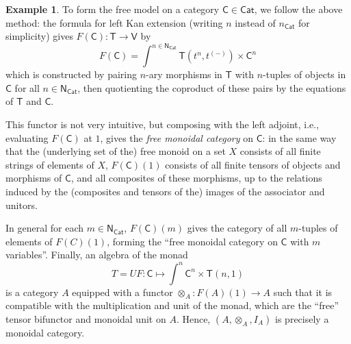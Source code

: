 \documentclass{amsart}
\theoremstyle{definition}
\newtheorem{example}[theorem]{Example}
\newcommand{\Cat}{\mathsf{Cat}}
\newcommand{\NN}{\mathsf{N}}
\newcommand{\V}{\mathsf{V}}
\newcommand{\C}{\mathsf{C}}
\newcommand{\T}{\mathsf{T}}
\newcommand{\maps}{\colon}
\begin{document}
\begin{example}
To form the free model on a category $\C\in \Cat$, we follow the above method: the formula for left Kan extension (writing $n$ instead of $n_\Cat$ for simplicity) gives $F(\C)\maps \T\to \V$ by 
\[   F(\C) = \int^{n\in \NN_\Cat} \T(t^{n},t^{(-)})\times \C^{n} \] 
which is constructed by pairing $n$-ary morphisms in $\T$ with $n$-tuples of objects in $\C$ for all $n\in \NN_\Cat$, then quotienting the coproduct of these pairs by the equations of $\T$ and $\C$.

This functor is not very intuitive, but composing with the left adjoint, i.e., evaluating $F(\C)$ at $1$, gives the \textit{free monoidal category} on $\C$: in the same way that the (underlying set of the) free monoid on a set $X$ consists of all finite strings of elements of $X$, $F(\C)(1)$ consists of all finite tensors of objects and morphisms of $\C$, and all composites of these morphisms, up to the relations induced by the (composites and tensors of the) images of the associator and unitors.

In general for each $m\in \NN_\Cat$, $F(\C)(m)$ gives the category of all $m$-tuples of elements of $F(C)(1)$, forming the ``free monoidal category on $\C$ with $m$ variables''.  Finally, an algebra of the monad 
\[  T = UF \maps \C \mapsto \int^n \C^n \times \T(n,1) \]
is a category $A$ equipped with a functor $\otimes_A\maps F(A)(1)\to A$ such that it is compatible with the multiplication and unit of the monad, which are the ``free'' tensor bifunctor and monoidal unit on $A$. Hence, $(A,\otimes_A,I_A)$ is precisely a monoidal category.   
\end{example}
\end{document}

